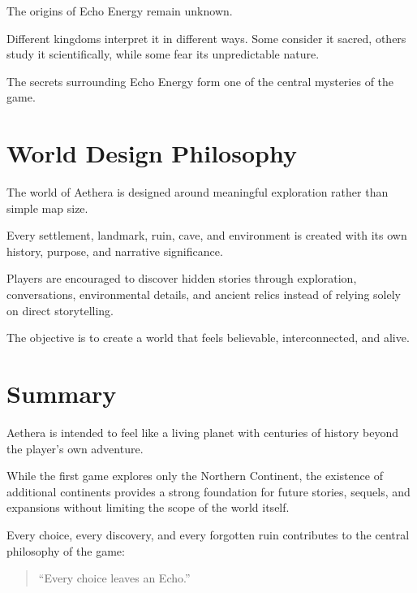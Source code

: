 The origins of Echo Energy remain unknown.

Different kingdoms interpret it in different ways. Some consider it sacred, others study it scientifically, while some fear its unpredictable nature.

The secrets surrounding Echo Energy form one of the central mysteries of the game.

\section{World Design Philosophy}

The world of Aethera is designed around meaningful exploration rather than simple map size.

Every settlement, landmark, ruin, cave, and environment is created with its own history, purpose, and narrative significance.

Players are encouraged to discover hidden stories through exploration, conversations, environmental details, and ancient relics instead of relying solely on direct storytelling.

The objective is to create a world that feels believable, interconnected, and alive.

\section{Summary}

Aethera is intended to feel like a living planet with centuries of history beyond the player's own adventure.

While the first game explores only the Northern Continent, the existence of additional continents provides a strong foundation for future stories, sequels, and expansions without limiting the scope of the world itself.

Every choice, every discovery, and every forgotten ruin contributes to the central philosophy of the game:

\begin{quote}
``Every choice leaves an Echo.''
\end{quote}